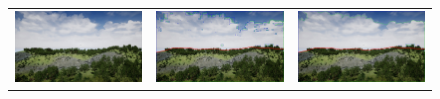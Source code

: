 \begin{figure}
    \centering
    \begin{tabular}{ccc}
        
    
    
    
    
    \includegraphics[width=.27\linewidth]{images/airsim_thresh/img_5.jpg} &
    \includegraphics[width=.27\linewidth]{images/airsim_thresh/img_adaptive_5.jpg} &
    \includegraphics[width=.27\linewidth]{images/airsim_thresh/img_thresh_5.jpg} \\
    

\end{tabular}
\end{figure}
